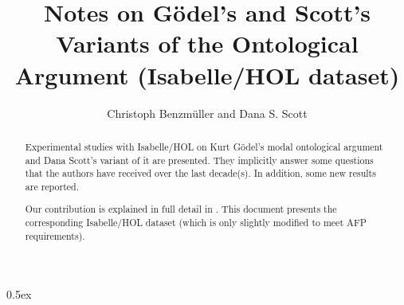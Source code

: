 \documentclass[11pt,a4paper]{article}
\begin{document}
\title{Notes on Gödel's and Scott's Variants of the Ontological
  Argument (Isabelle/HOL dataset)}
\author{Christoph Benzm{\"u}ller and Dana S. Scott}
\maketitle

\begin{abstract}
Experimental studies with Isabelle/HOL on Kurt G\"odel's modal
ontological argument and Dana Scott's variant of it are presented.
They implicitly answer some questions that the authors have received
over the last decade(s). In addition, some new results are reported.

Our contribution is explained in full detail in \cite{J75}.  This document
presents the corresponding Isabelle/HOL dataset (which is only slightly modified
to meet AFP requirements).
\end{abstract}

\tableofcontents

\parindent 0pt\parskip 0.5ex
\end{document}
